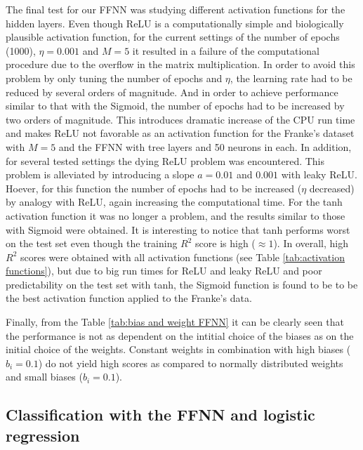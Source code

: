 \documentclass{emulateapj}
\begin{document}
The final test for our FFNN was studying different activation functions for the hidden layers. Even though ReLU is a computationally simple and biologically plausible activation function, for the current settings of the number of epochs (1000), $\eta=0.001$ and $M=5$ it resulted in a failure of the computational procedure due to the overflow in the matrix multiplication. In order to avoid this problem by only tuning the number of epochs and $\eta$, the learning rate had to be reduced by several orders of magnitude. And in order to achieve performance similar to that with the Sigmoid, the number of epochs had to be increased by two orders of magnitude. This introduces dramatic increase of the CPU run time and makes ReLU not favorable as an activation function for the Franke's dataset with $M=5$ and the FFNN with tree layers and 50 neurons in each. In addition, for several tested settings the dying ReLU problem was encountered. This problem is alleviated by introducing a slope $a=0.01$ and $0.001$ with leaky ReLU. Hoever, for this function the number of epochs had to be increased ($\eta$ decreased) by analogy with ReLU, again increasing the computational time. For the tanh activation function it was no longer a problem, and the results similar to those with Sigmoid were obtained. It is interesting to notice that tanh performs worst on the test set even though the training $R^2$ score is high  ($\approx1$). In overall, high $R^2$ scores were obtained with all activation functions (see Table \ref{tab:activation functions}), but due to big run times for ReLU and leaky ReLU and poor predictability on the test set with tanh, the Sigmoid function is found to be to be the best activation function applied to the Franke's data.

Finally, from the Table \ref{tab:bias and weight FFNN} it can be clearly seen that the performance is not as dependent on the intitial choice of the biases as on the initial choice of the weights. Constant weights in combination with high biases ($b_i=0.1$) do not yield high scores as compared to normally distributed weights and small biases ($b_i=0.1$).

\subsection{Classification with the FFNN and logistic regression}  
\label{sec: Discussion_1}
\end{document}
